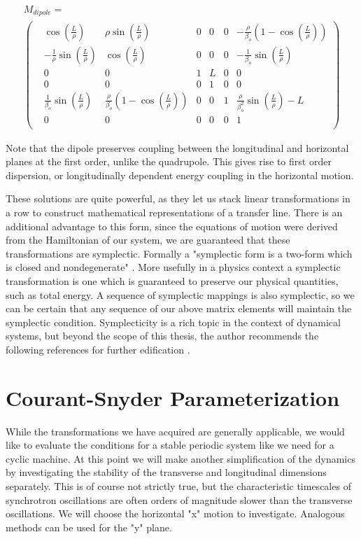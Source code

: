 \begin{multline} \label{mat:dipole}
	M_{dipole} = \\
\begin{pmatrix}
	&\cos{\left(\frac{L}{\rho}\right)} &\rho \sin{\left(\frac{L}{\rho}\right)} &0 &0 &0 &-\frac{\rho}{\beta_o}\left(1 - \cos{\left(\frac{L}{\rho}\right)}\right)\\
	&-\frac{1}{\rho}\sin{\left(\frac{L}{\rho}\right)} &\cos{\left(\frac{L}{\rho}\right)} &0 &0 &0 &-\frac{1}{\beta_o}\sin{\left(\frac{L}{\rho}\right)}\\
	&0 &0 &1 &L &0 &0\\
	&0 &0 &0 &1 &0 &0\\
	&\frac{1}{\beta_o}\sin{\left(\frac{L}{\rho}\right)} &\frac{\rho}{\beta_o}\left(1 - \cos{\left(\frac{L}{\rho}\right)}\right) &0 &0 &1 &\frac{\rho}{\beta_o^2}\sin{\left(\frac{L}{\rho}\right)} - L\\
	&0 &0 &0 &0 &0 &1\\
\end{pmatrix}
\end{multline}

Note that the dipole preserves coupling between the longitudinal and horizontal planes at the first order, unlike the quadrupole. This gives rise to first order dispersion, or longitudinally dependent energy coupling in the horizontal motion. 

These solutions are quite powerful, as they let us stack linear transformations in a row to construct mathematical representations of a transfer line. There is an additional advantage to this form, since the equations of motion were derived from the Hamiltonian of our system, we are guaranteed that these transformations are symplectic. Formally a "symplectic form is a two-form which is closed and nondegenerate" \cite{JoseAndSalatan}. More usefully in a physics context a symplectic transformation is one which is guaranteed to preserve our physical quantities, such as total energy. A sequence of symplectic mappings is also symplectic, so we can be certain that any sequence of our above matrix elements will maintain the symplectic condition. Symplecticity is a rich topic in the context of dynamical systems, but beyond the scope of this thesis, the author recommends the following references for further edification \cite{ForrestSymplectic,YoshidaSymplectic}.

\section{Courant-Snyder Parameterization} \label{sec:CSparam}
While the transformations we have acquired are generally applicable, we would like to evaluate the conditions for a stable periodic system like we need for a cyclic machine. At this point we will make another simplification of the dynamics by investigating the stability of the transverse and longitudinal dimensions separately. This is of course not strictly true, but the characteristic timescales of synchrotron oscillations are often orders of magnitude slower than the transverse oscillations. We will choose the horizontal "x" motion to investigate. Analogous methods can be used for the "y" plane.

